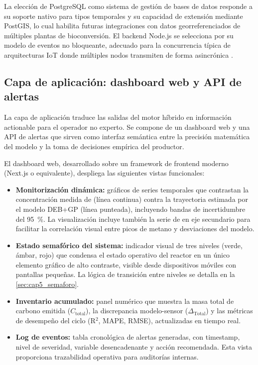 La elección de PostgreSQL como sistema de gestión de bases de datos responde a su soporte nativo para tipos temporales y su capacidad de extensión mediante PostGIS, lo cual habilita futuras integraciones con datos georreferenciados de múltiples plantas de bioconversión. El backend Node.js se selecciona por su modelo de eventos no bloqueante, adecuado para la concurrencia típica de arquitecturas IoT donde múltiples nodos transmiten de forma asincrónica \parencite{weichertReviewMachineLearning2019}.

\subsection{Capa de aplicación: dashboard web y API de alertas}
\label{subsec:cap5_aplicacion}

La capa de aplicación traduce las salidas del motor híbrido en información actionable para el operador no experto. Se compone de un dashboard web y una API de alertas que sirven como interfaz semántica entre la precisión matemática del modelo y la toma de decisiones empírica del productor.

El dashboard web, desarrollado sobre un framework de frontend moderno (Next.js o equivalente), despliega las siguientes vistas funcionales:

\begin{itemize}
    \item \textbf{Monitorización dinámica:} gráficos de series temporales que contrastan la concentración medida de  (línea continua) contra la trayectoria estimada por el modelo DEB+GP (línea punteada), incluyendo bandas de incertidumbre del \num{95}~\%. La visualización incluye también la serie de  en eje secundario para facilitar la correlación visual entre picos de metano y desviaciones del modelo.
    
    \item \textbf{Estado semafórico del sistema:} indicador visual de tres niveles (verde, ámbar, rojo) que condensa el estado operativo del reactor en un único elemento gráfico de alto contraste, visible desde dispositivos móviles con pantallas pequeñas. La lógica de transición entre niveles se detalla en la \cref{sec:cap5_semaforo}.
    
    \item \textbf{Inventario acumulado:} panel numérico que muestra la masa total de carbono emitida ($C_{\text{total}}$), la discrepancia modelo-sensor ($\Delta_{\text{Total}}$) y las métricas de desempeño del ciclo (R$^2$, MAPE, RMSE), actualizadas en tiempo real.
    
    \item \textbf{Log de eventos:} tabla cronológica de alertas generadas, con timestamp, nivel de severidad, variable desencadenante y acción recomendada. Esta vista proporciona trazabilidad operativa para auditorías internas.
\end{itemize}

